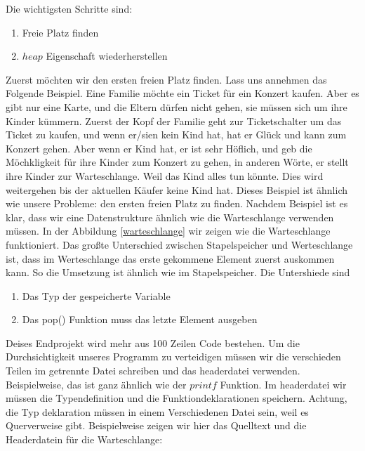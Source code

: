 Die wichtigsten Schritte sind:
\begin{enumerate}
\item Freie Platz finden
\item $heap$ Eigenschaft wiederherstellen
\end{enumerate}
Zuerst möchten wir den ersten freien Platz finden. Lass uns annehmen
das Folgende Beispiel. Eine Familie möchte ein Ticket für ein Konzert kaufen.
Aber es gibt nur eine Karte, und die Eltern dürfen nicht gehen, sie müssen sich 
um ihre Kinder kümmern. Zuerst der Kopf der Familie geht zur Ticketschalter
um das Ticket zu kaufen, und wenn er/sien  kein Kind hat, hat er Glück und
kann zum Konzert gehen. Aber wenn er Kind hat, er ist sehr Höflich, und 
geb die Möchkligkeit für ihre Kinder zum Konzert zu gehen, in anderen Wörte, er
stellt ihre Kinder zur Warteschlange. Weil das Kind alles tun könnte. Dies wird 
weitergehen bis der aktuellen Käufer keine Kind hat. Dieses Beispiel ist ähnlich 
wie unsere Probleme: den ersten freien Platz zu finden. Nachdem Beispiel ist es 
klar, dass wir eine Datenstrukture ähnlich wie die Warteschlange verwenden müssen. 
In der Abbildung \ref{warteschlange} wir zeigen wie die Warteschlange
funktioniert. Das großte Unterschied zwischen Stapelspeicher und Werteschlange ist,
dass im Werteschlange das erste gekommene Element zuerst auskommen kann. 
So die Umsetzung ist ähnlich wie im Stapelspeicher. Die Untershiede sind
\begin{enumerate}
\item Das Typ der gespeicherte Variable
\item Das pop() Funktion muss das letzte Element ausgeben
\end{enumerate}

Deises Endprojekt wird mehr aus 100 Zeilen Code bestehen.
Um die Durchsichtigkeit unseres Programm zu verteidigen müssen
wir die verschieden Teilen im getrennte Datei schreiben und
das headerdatei verwenden. Beispielweise, das ist ganz ähnlich wie der 
$printf$ Funktion. Im headerdatei wir müssen die Typendefinition
und die Funktiondeklarationen speichern. Achtung, die Typ deklaration
müssen in einem Verschiedenen Datei sein, weil es Querverweise
gibt. Beispielweise zeigen wir hier das Quelltext und die Headerdatein
für die Warteschlange:

